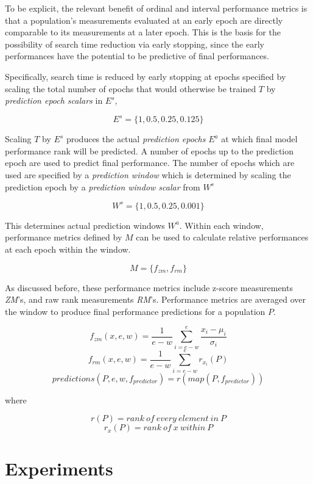 \documentclass[twocolumn]{article}
\begin{document}
To be explicit, the relevant benefit of ordinal and interval performance metrics is that a population's measurements evaluated at an early epoch are 
directly comparable to its measurements at a later epoch. 
This is the basis for the possibility of search time reduction via early stopping, since the early performances have the potential to be predictive of final performances.

Specifically, search time is reduced by early stopping at epochs specified by scaling the total number of epochs that would otherwise be trained $T$ by 
\emph{prediction epoch scalars} in $E^s$,

\[E^s = \{1, 0.5, 0.25, 0.125\}\]

Scaling $T$ by $E^s$ produces the actual \emph{prediction epochs} $E^{a}$ at which final model performance rank will be predicted.
A number of epochs up to the prediction epoch are used to predict final performance. 
The number of epochs which are used are specified by a \emph{prediction window} which is determined by scaling the prediction epoch
by a \emph{prediction window scalar} from $W^s$

\[W^s = \{1, 0.5, 0.25, 0.001\}\]

This determines actual prediction windows $W^a$.
Within each window, performance metrics defined by $M$ can be used to calculate relative performances at each epoch within the window.

\[M = \{f_{zm}, f_{rm}\}\]

As discussed before, these performance metrics include z-score measurements \emph{ZM}'s, and raw rank measurements \emph{RM}'s.
Performance metrics are averaged over the window to produce final performance predictions for a population $P$.

\[f_{zm}(x, e, w) = \frac{1}{e-w}\sum_{i=e-w}^{e}\frac{x_i - \mu_i}{\sigma_i}\]
\[f_{rm}(x, e, w) = \frac{1}{e-w}\sum_{i=e-w}^{e}r_{x_{i}}(P)\]
\[predictions(P, e, w, f_{predictor}) = r(map(P, f_{predictor}))\]
\begin{center}
where
\end{center}
\[r(P) = rank\ of\ every\ element\ in\ P\]
\[r_{x}(P) = rank\ of\ x\ within\ P\]

\section{Experiments}
\end{document}
